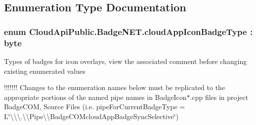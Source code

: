 \subsection{Enumeration Type Documentation}
\hypertarget{namespace_cloud_api_public_1_1_badge_n_e_t_afab91a750338fef6bd4ef08f5381c4e4}{
\subsubsection[{cloud\-App\-Icon\-Badge\-Type}]{\setlength{\rightskip}{0pt plus 5cm}enum {\bf Cloud\-Api\-Public.\-Badge\-N\-E\-T.\-cloud\-App\-Icon\-Badge\-Type} \-: byte}}\label{namespace_cloud_api_public_1_1_badge_n_e_t_afab91a750338fef6bd4ef08f5381c4e4}


Types of badges for icon overlays, view the associated comment before changing existing enumerated values 

!!!!!!! Changes to the enumeration names below must be replicated to the appropriate portions of the named pipe names in Badge\-Icon$\ast$.cpp files in project Badge\-C\-O\-M, Source Files (i.\-e. pipe\-For\-Current\-Badge\-Type = L\char`\"{}\textbackslash{}\textbackslash{}\textbackslash{}.\textbackslash{}\textbackslash{}\-Pipe\textbackslash{}\textbackslash{}\-Badge\-C\-O\-Mcloud\-App\-Badge\-Sync\-Selective\char`\"{}) 